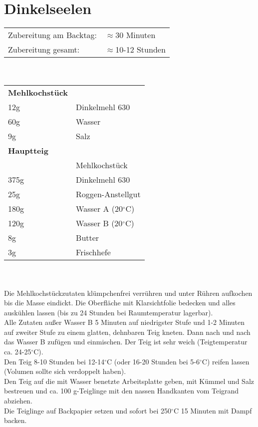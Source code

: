 \section{Dinkelseelen}
\begin{tabular}{ll}
    Zubereitung am Backtag: & $\approx$30 Minuten    \\
    Zubereitung gesamt:     & $\approx$10-12 Stunden
\end{tabular}\\\paragraph*{}
\begin{tabular}{ll}
    \textbf{Mehlkochstück} \\
    12g  & Dinkelmehl 630         \\
    60g  & Wasser                 \\
    9g   & Salz                   \\
    \textbf{Hauptteig} \\
    & Mehlkochstück          \\
    375g & Dinkelmehl 630         \\
    25g  & Roggen-Anstellgut      \\
    180g & Wasser A (20$^\circ$C) \\
    120g & Wasser B (20$^\circ$C) \\
    8g   & Butter                 \\
    3g   & Frischhefe             \\
\end{tabular}\\\paragraph*{}
Die Mehlkochstückzutaten klümpchenfrei verrühren und unter Rühren aufkochen bis die Masse eindickt. Die Oberfläche mit Klarsichtfolie bedecken und alles auskühlen lassen (bis zu 24 Stunden bei Raumtemperatur lagerbar).\\
Alle Zutaten außer Wasser B 5 Minuten auf niedrigster Stufe und 1-2 Minuten auf zweiter Stufe zu einem glatten, dehnbaren Teig kneten. Dann nach und nach das Wasser B zufügen und einmischen. Der Teig ist sehr weich (Teigtemperatur ca. 24-25$^\circ$C).\\
Den Teig 8-10 Stunden bei 12-14$^\circ$C (oder 16-20 Stunden bei 5-6$^\circ$C) reifen lassen (Volumen sollte sich verdoppelt haben).\\
Den Teig auf die mit Wasser benetzte Arbeitsplatte geben, mit Kümmel und Salz bestreuen und ca. 100 g-Teiglinge mit den nassen Handkanten vom Teigrand abziehen.\\
Die Teiglinge auf Backpapier setzen und sofort bei 250$^\circ$C 15 Minuten mit Dampf backen.\\
\newpage


